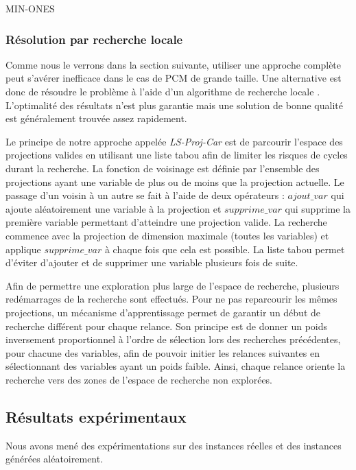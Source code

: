 MIN-ONES
\subsubsection{Résolution par recherche locale}
Comme nous le verrons dans la section suivante, utiliser une approche complète peut s'avérer inefficace dans le cas de PCM de grande taille. Une alternative est donc de résoudre le problème à l'aide d'un algorithme de recherche locale \cite{Hoos2004}. L'optimalité des résultats n'est plus garantie mais une solution de bonne qualité est généralement trouvée assez rapidement.

Le principe de notre approche appelée \emph{LS-Proj-Car} est de parcourir l'espace des projections valides en utilisant une liste tabou \cite{Glover1997} afin de limiter les risques de cycles durant la recherche. La fonction de voisinage est définie par l'ensemble des projections ayant une variable de plus ou de moins que la projection actuelle. Le passage d'un voisin à un autre se fait à l'aide de deux opérateurs : $ajout\_var$ qui ajoute aléatoirement une variable à la projection et $supprime\_var$ qui supprime la première variable permettant d'atteindre une projection valide. La recherche commence avec la projection de dimension maximale (toutes les variables) et applique $supprime\_var$ à chaque fois que cela est possible. La liste tabou permet d'éviter d'ajouter et de supprimer une variable plusieurs fois de suite.

Afin de permettre une exploration plus large de l'espace de recherche, plusieurs redémarrages de la recherche sont effectués. Pour ne pas reparcourir les mêmes projections, un mécanisme d'apprentissage permet de garantir un début de recherche différent pour chaque relance. Son principe est de donner un poids inversement proportionnel à l'ordre de sélection lors des recherches précédentes, pour chacune des variables, afin de pouvoir initier les relances suivantes en sélectionnant des variables ayant un poids faible. Ainsi, chaque relance oriente la recherche vers des zones de l'espace de recherche non explorées.
\subsection{Résultats expérimentaux}


Nous avons mené des expérimentations sur des instances réelles et des instances générées aléatoirement.

